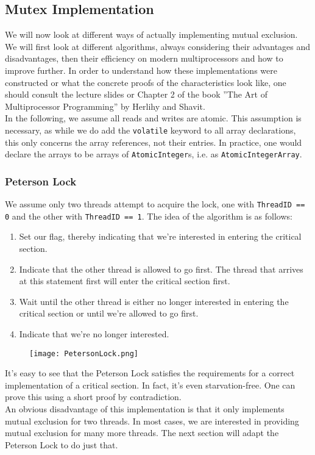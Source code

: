 \documentclass[main]{subfiles}
\begin{document}

\subsection{Mutex Implementation}
We will now look at different ways of actually implementing mutual exclusion. We will first look at different algorithms, always considering their advantages and disadvantages, then their efficiency on modern multiprocessors and how to improve further. In order to understand how these implementations were constructed or what the concrete proofs of the characteristics look like, one should consult the lecture slides or Chapter 2 of the book ''The Art of Multiprocessor Programming'' by Herlihy and Shavit.\\[3mm]
In the following, we assume all reads and writes are atomic. This assumption is necessary, as while we do add the \texttt{volatile} keyword to all array declarations, this only concerns the array references, not their entries. In practice, one would declare the arrays to be arrays of \texttt{AtomicInteger}s, i.e. as \texttt{AtomicIntegerArray}.

\subsubsection{Peterson Lock}
We assume only two threads attempt to acquire the lock, one with \texttt{ThreadID == 0} and the other with \texttt{ThreadID == 1}. The idea of the algorithm is as follows:
\begin{enumerate}
    \item Set our flag, thereby indicating that we're interested in entering the critical section.
    \item Indicate that the other thread is allowed to go first. The thread that arrives at this statement first will enter the critical section first.
    \item Wait until the other thread is either no longer interested in entering the critical section or until we're allowed to go first.
    \item Indicate that we're no longer interested.
\end{enumerate}
\begin{figure}[H]
    \centering
    \texttt{[image: PetersonLock.png]}
\end{figure}
It's easy to see that the Peterson Lock satisfies the requirements for a correct implementation of a critical section. In fact, it's even starvation-free. One can prove this using a short proof by contradiction.\\[3mm]
An obvious disadvantage of this implementation is that it only implements mutual exclusion for two threads. In most cases, we are interested in providing mutual exclusion for many more threads. The next section will adapt the Peterson Lock to do just that.
\end{document}
